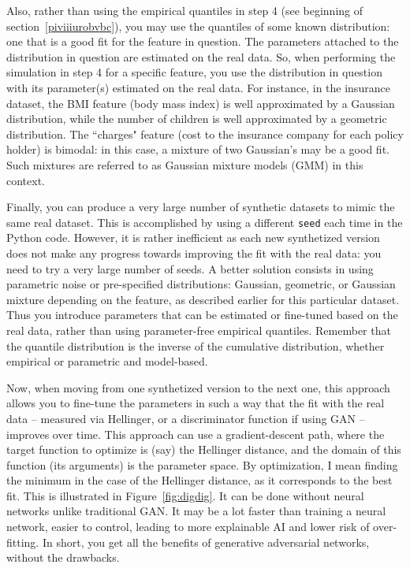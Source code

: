 \documentclass[oneside,10pt]{book}
\begin{document}
Also, rather than using the empirical quantiles in step 4 (see beginning of section~\ref{piviiiurobvbc}), you may use the quantiles of some known distribution: one that is a good fit for the feature in question. The parameters attached to the distribution in question are estimated on the real data. So, when performing the simulation in step 4 for a specific feature, you use the distribution in question with its parameter(s) estimated on the real data. For instance, in the insurance dataset, the BMI feature (body mass index) is well approximated by a Gaussian distribution, while the number of children is
 well approximated by a geometric distribution. The ``charges" feature (cost to the insurance company for each policy holder) is bimodal:
in this case, a mixture of two Gaussian's may be a good fit. Such mixtures are referred to as
\textcolor{index}{Gaussian mixture models} (GMM) in this context.

Finally, you can produce a very large number of synthetic datasets to mimic the same real dataset. This is accomplished by using a different \texttt{seed} each time in the Python code. However, it is rather inefficient as each new synthetized version
 does not make any progress towards improving the fit with the real data: you need to try a very large number of seeds.  A better solution consists in using parametric noise or pre-specified distributions: Gaussian, geometric, or Gaussian mixture depending on the feature, as described earlier for this particular dataset. Thus you introduce parameters that can be estimated or fine-tuned based on the real data, rather than using parameter-free
 empirical quantiles. Remember that the quantile distribution is the inverse of the cumulative distribution, whether empirical or parametric and model-based.

Now, when moving from one synthetized version to the next one, this approach allows you to fine-tune the parameters in such a way that the fit with the real data -- measured via Hellinger, or a discriminator function if using GAN -- improves over time. This approach can use a gradient-descent path,
 where the target function to optimize is (say) the Hellinger distance, and the domain of this function (its arguments) is the parameter space.
 By optimization, I mean finding the minimum in the case of the Hellinger distance, as it corresponds to the best fit.
This is illustrated in Figure~\ref{fig:digdig}. It can be done without neural networks unlike traditional GAN. It may be a lot faster than
 training a neural network, easier to control, leading to more explainable AI and lower risk of over-fitting.
 In short, you get all the benefits of \textcolor{index}{generative adversarial networks}, without the drawbacks.
\end{document}

